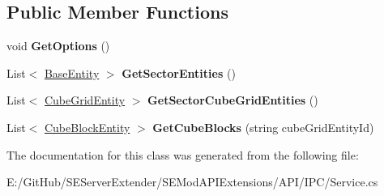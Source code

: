 \subsection*{Public Member Functions}
\begin{DoxyCompactItemize}
\item 
\hypertarget{class_s_e_mod_a_p_i_extensions_1_1_a_p_i_1_1_i_p_c_1_1_web_service_ab86df080c4681b1f143a98386bcb7ced}{}void {\bfseries Get\+Options} ()\label{class_s_e_mod_a_p_i_extensions_1_1_a_p_i_1_1_i_p_c_1_1_web_service_ab86df080c4681b1f143a98386bcb7ced}

\item 
\hypertarget{class_s_e_mod_a_p_i_extensions_1_1_a_p_i_1_1_i_p_c_1_1_web_service_a85ff809d2ae3ad576c48e9cad1aece69}{}List$<$ \hyperlink{class_s_e_mod_a_p_i_internal_1_1_a_p_i_1_1_entity_1_1_base_entity}{Base\+Entity} $>$ {\bfseries Get\+Sector\+Entities} ()\label{class_s_e_mod_a_p_i_extensions_1_1_a_p_i_1_1_i_p_c_1_1_web_service_a85ff809d2ae3ad576c48e9cad1aece69}

\item 
\hypertarget{class_s_e_mod_a_p_i_extensions_1_1_a_p_i_1_1_i_p_c_1_1_web_service_ab499b5c14885b50b6b24473ba523d2d5}{}List$<$ \hyperlink{class_s_e_mod_a_p_i_internal_1_1_a_p_i_1_1_entity_1_1_sector_1_1_sector_object_1_1_cube_grid_entity}{Cube\+Grid\+Entity} $>$ {\bfseries Get\+Sector\+Cube\+Grid\+Entities} ()\label{class_s_e_mod_a_p_i_extensions_1_1_a_p_i_1_1_i_p_c_1_1_web_service_ab499b5c14885b50b6b24473ba523d2d5}

\item 
\hypertarget{class_s_e_mod_a_p_i_extensions_1_1_a_p_i_1_1_i_p_c_1_1_web_service_ac1ced2b4daf3a97f357724247c3d19f6}{}List$<$ \hyperlink{class_s_e_mod_a_p_i_internal_1_1_a_p_i_1_1_entity_1_1_sector_1_1_sector_object_1_1_cube_grid_1_1_cube_block_entity}{Cube\+Block\+Entity} $>$ {\bfseries Get\+Cube\+Blocks} (string cube\+Grid\+Entity\+Id)\label{class_s_e_mod_a_p_i_extensions_1_1_a_p_i_1_1_i_p_c_1_1_web_service_ac1ced2b4daf3a97f357724247c3d19f6}

\end{DoxyCompactItemize}


The documentation for this class was generated from the following file\+:\begin{DoxyCompactItemize}
\item 
E\+:/\+Git\+Hub/\+S\+E\+Server\+Extender/\+S\+E\+Mod\+A\+P\+I\+Extensions/\+A\+P\+I/\+I\+P\+C/Service.\+cs\end{DoxyCompactItemize}
